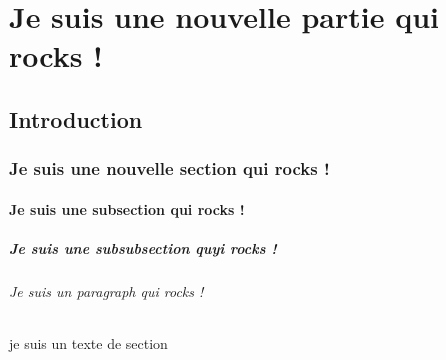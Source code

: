 



\maketitle
\tableofcontents 

\part{Je suis une nouvelle partie qui rocks !}
\chapter{Introduction}
\section{Je suis une nouvelle section qui rocks !}
\subsection{Je suis une subsection qui rocks !}
\subsubsection{Je suis une subsubsection quyi rocks !}
\paragraph{Je suis un paragraph qui rocks !}
je suis un texte de section 



